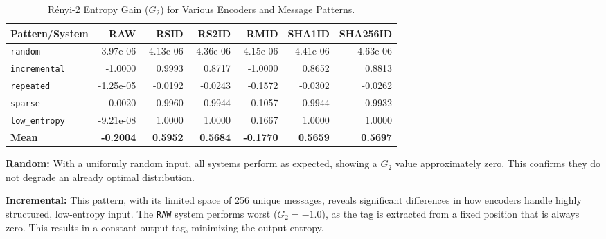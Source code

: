 \documentclass[english,BCOR=4mm,cdfont=false]{tudscrreprt} %
\begin{document}
\begin{table}[hbt!]
\centering
\caption{Rényi-2 Entropy Gain ($G_2$) for Various Encoders and Message Patterns.}
\label{tab:G2}
\begin{tabular}{@{}lrrrrrr@{}}
    \toprule
    \textbf{Pattern/System} & \textbf{RAW} & \textbf{RSID} & \textbf{RS2ID} & \textbf{RMID} & \textbf{SHA1ID} & \textbf{SHA256ID} \\
    \midrule
    \texttt{random}         & -3.97e-06 & -4.13e-06 & -4.36e-06 & -4.15e-06 & -4.41e-06 & -4.63e-06 \\
    \texttt{incremental}    & -1.0000   & 0.9993    & 0.8717    & -1.0000   & 0.8652    & 0.8813 \\
    \texttt{repeated}       & -1.25e-05 & -0.0192   & -0.0243   & -0.1572   & -0.0302   & -0.0262 \\
    \texttt{sparse}         & -0.0020   & 0.9960    & 0.9944    & 0.1057    & 0.9944    & 0.9932 \\
    \texttt{low\_entropy}   & -9.21e-08 & 1.0000    & 1.0000    & 0.1667    & 1.0000    & 1.0000 \\
    \midrule
    \textbf{Mean}           & \textbf{-0.2004} & \textbf{0.5952} & \textbf{0.5684} & \textbf{-0.1770} & \textbf{0.5659} & \textbf{0.5697} \\
    \bottomrule
\end{tabular}
\end{table}

\textbf{Random:} With a uniformly random input, all systems perform as expected, showing a $G_2$ value approximately zero. This confirms they do not degrade an already optimal distribution.

\textbf{Incremental:} This pattern, with its limited space of 256 unique messages, reveals significant differences in how encoders handle highly structured, low-entropy input. The \texttt{RAW} system performs worst ($G_2 = -1.0$), as the tag is extracted from a fixed position that is always zero. This results in a constant output tag, minimizing the output entropy.
\end{document}
